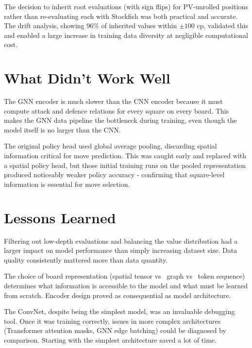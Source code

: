 The decision to inherit root evaluations (with sign flips) for PV-unrolled positions rather than re-evaluating each with Stockfish was both practical and accurate. The drift analysis, showing 96\% of inherited values within $\pm 100$ cp, validated this and enabled a large increase in training data diversity at negligible computational cost.

\section{What Didn't Work Well}

The GNN encoder is much slower than the CNN encoder because it must compute attack and defence relations for every square on every board. This makes the GNN data pipeline the bottleneck during training, even though the model itself is no larger than the CNN.

The original policy head used global average pooling, discarding spatial information critical for move prediction. This was caught early and replaced with a spatial policy head, but those initial training runs on the pooled representation produced noticeably weaker policy accuracy - confirming that square-level information is essential for move selection.


\section{Lessons Learned}

Filtering out low-depth evaluations and balancing the value distribution had a larger impact on model performance than simply increasing dataset size. Data quality consistently mattered more than data quantity.

The choice of board representation (spatial tensor vs \ graph vs \ token sequence) determines what information is accessible to the model and what must be learned from scratch. Encoder design proved as consequential as model architecture.

The ConvNet, despite being the simplest model, was an invaluable debugging tool. Once it was training correctly, issues in more complex architectures (Transformer attention masks, GNN edge batching) could be diagnosed by comparison. Starting with the simplest architecture saved a lot of time.

